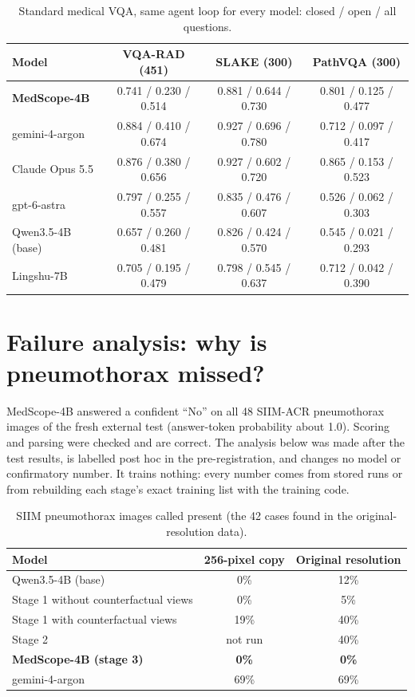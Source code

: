 \documentclass[11pt]{article}
\begin{document}
\begin{table}[t]
\centering\footnotesize\setlength{\tabcolsep}{4pt}
\caption{Standard medical VQA, same agent loop for every model: closed / open / all questions.}
\label{tab:vqa}
\begin{tabular}{lccc}
\toprule
Model & VQA-RAD (451) & SLAKE (300) & PathVQA (300) \\
\midrule
\textbf{MedScope-4B} & 0.741 / 0.230 / 0.514 & 0.881 / 0.644 / 0.730 & 0.801 / 0.125 / 0.477 \\
gemini-4-argon & 0.884 / 0.410 / 0.674 & 0.927 / 0.696 / 0.780 & 0.712 / 0.097 / 0.417 \\
Claude Opus 5.5 & 0.876 / 0.380 / 0.656 & 0.927 / 0.602 / 0.720 & 0.865 / 0.153 / 0.523 \\
gpt-6-astra & 0.797 / 0.255 / 0.557 & 0.835 / 0.476 / 0.607 & 0.526 / 0.062 / 0.303 \\
Qwen3.5-4B (base) & 0.657 / 0.260 / 0.481 & 0.826 / 0.424 / 0.570 & 0.545 / 0.021 / 0.293 \\
Lingshu-7B & 0.705 / 0.195 / 0.479 & 0.798 / 0.545 / 0.637 & 0.712 / 0.042 / 0.390 \\
\bottomrule
\end{tabular}
\end{table}

\section{Failure analysis: why is pneumothorax missed?}\label{sec:ptx}
MedScope-4B answered a confident ``No'' on all 48 SIIM-ACR pneumothorax images of the fresh external test (answer-token probability about 1.0). Scoring and parsing were checked and are correct. The analysis below was made after the test results, is labelled post hoc in the pre-registration, and changes no model or confirmatory number. It trains nothing: every number comes from stored runs or from rebuilding each stage's exact training list with the training code.

\begin{table}[t]
\centering\small
\caption{SIIM pneumothorax images called present (the 42 cases found in the original-resolution data).}
\label{tab:ptx}
\begin{tabular}{lcc}
\toprule
Model & 256-pixel copy & Original resolution \\
\midrule
Qwen3.5-4B (base) & 0\% & 12\% \\
Stage 1 without counterfactual views & 0\% & 5\% \\
Stage 1 with counterfactual views & 19\% & 40\% \\
Stage 2 & not run & 40\% \\
\textbf{MedScope-4B (stage 3)} & \textbf{0\%} & \textbf{0\%} \\
gemini-4-argon & 69\% & 69\% \\
\bottomrule
\end{tabular}
\end{table}
\end{document}
